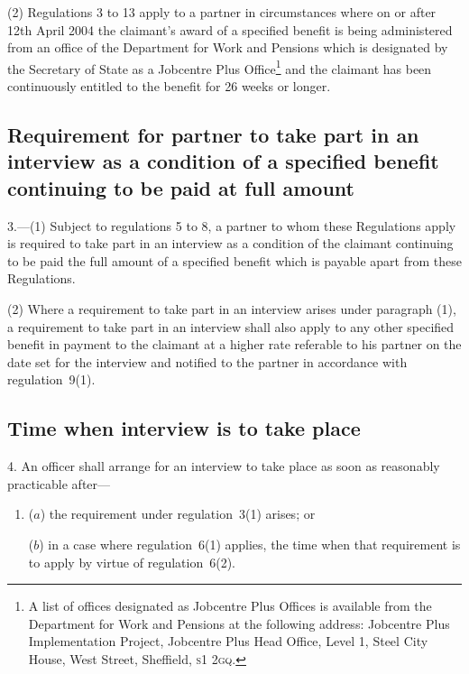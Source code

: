 \documentclass[12pt,a4paper]{article}
\begin{document}
(2) Regulations 3 to 13 apply to a partner in circumstances where on or after 12th April 2004 the claimant’s award of a specified benefit is being administered from an office of the Department for Work and Pensions which is designated by the Secretary of State as a Jobcentre Plus Office\footnote{A list of offices designated as Jobcentre Plus Offices is available from the Department for Work and Pensions at the following address: Jobcentre Plus Implementation Project, Jobcentre Plus Head Office, Level 1, Steel City House, West Street, Sheffield, \textsc{\lowercase{S1 2GQ}}.} and the claimant has been continuously entitled to the benefit for 26 weeks or longer.

\subsection[3. Requirement for partner to take part in an interview as a condition of a specified benefit continuing to be paid at full amount]{Requirement for partner to take part in an interview as a condition of a specified benefit continuing to be paid at full amount}

3.---(1)  Subject to regulations 5 to 8, a partner to whom these Regulations apply is required to take part in an interview as a condition of the claimant continuing to be paid the full amount of a specified benefit which is payable apart from these Regulations.

(2) Where a requirement to take part in an interview arises under paragraph (1), a requirement to take part in an interview shall also apply to any other specified benefit in payment to the claimant at a higher rate referable to his partner on the date set for the interview and notified to the partner in accordance with regulation~9(1).

\subsection[4. Time when interview is to take place]{Time when interview is to take place}

4.  An officer shall arrange for an interview to take place as soon as reasonably practicable after—
\begin{enumerate}\item[]
($a$) the requirement under regulation~3(1) arises; or

($b$) in a case where regulation~6(1) applies, the time when that requirement is to apply by virtue of regulation~6(2).
\end{enumerate}
\end{document}
